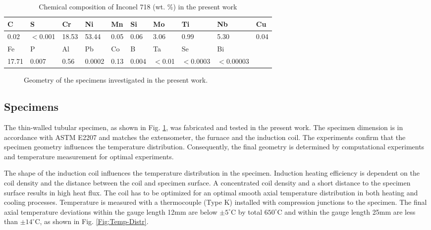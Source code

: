 \documentclass[preprint,5p,twocolumn,11pt,sort&compress]{elsarticle}
\newcommand{\marked}[1]{\textcolor{red}{#1}}
\begin{document}
\begin{table*}[htbp]
  \centering
  \caption{Chemical composition of Inconel 718 (wt. \%) in the present work}\vspace{0.1cm}
    \begin{tabular}{llllllllll}
    \hline
    C     & S     & Cr    & Ni    & Mn    & Si    & Mo    & Ti    & Nb    & Cu \\
    \hline
    0.02  & $<$0.001 & 18.53 & 53.44 & 0.05  & 0.06  & 3.06  & 0.99  & 5.30  & 0.04 \\
    \hline
    Fe    & P     & Al    & Pb    & Co    & B     & Ta    & Se    & Bi    &  \\
    \hline
    17.71 & 0.007 & 0.56  & 0.0002 & 0.13  & 0.004 & $<$0.01 & $<$0.0003 & $<$0.00003 &  \\
    \hline
    \end{tabular}%
  \label{Tab:ChemicalCompositionofIN718}%
\end{table*}%

\begin{figure}[htp]
\caption{Geometry of the specimens investigated in the present work.}
\label{Fig:Specimen}
\end{figure}

\subsection{Specimens}
The thin-walled tubular specimen, as shown in Fig. \ref{Fig:Specimen}, was fabricated and tested in the present work. The specimen dimension is in accordance with ASTM E2207 \cite{ASTM2014} and matches the extensometer, the furnace and the induction coil. The experiments confirm that the specimen geometry influences the temperature distribution. Consequently, the final geometry is determined by computational experiments and temperature measurement for optimal experiments.

The shape of the induction coil influences the temperature distribution in the specimen. Induction heating efficiency is dependent on the coil density and the distance between the coil and specimen surface. A concentrated coil density and a short distance to the specimen surface results in high heat flux. The coil has to be optimized for an optimal smooth axial temperature distribution in both heating and cooling processes. Temperature is measured with a thermocouple (Type K) installed with compression junctions to the specimen. The final axial temperature deviations within the gauge length 12mm are below $\pm5^\circ$C by total $650^\circ$C and within the gauge length 25mm are less than $\pm14^\circ$C, as shown in Fig. \ref{Fig:Temp-Distr}.
\end{document}
